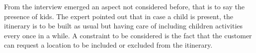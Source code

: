 \documentclass[11pt]{article} %
\begin{document}
From the interview emerged an aspect not considered before, that is to say the presence of kids. The expert pointed out that in case a child is present, the itinerary is to be built as usual but having care of including children activities every once in a while.
A constraint to be considered is the fact that the customer can request a location to be included or excluded from the itinerary.


\nocite{*}


\end{document}
